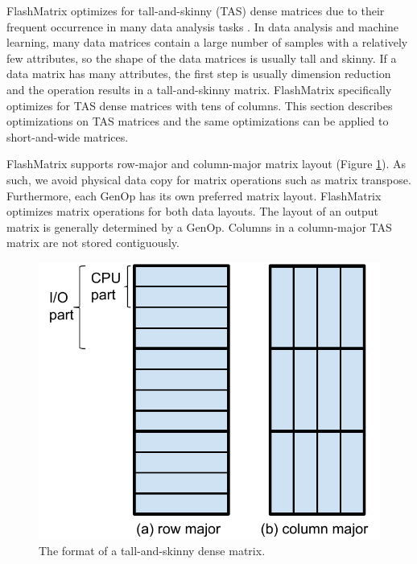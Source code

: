 FlashMatrix optimizes for tall-and-skinny (TAS) dense matrices due to their
frequent occurrence in many data analysis tasks \cite{}.
In data analysis and machine learning, many data matrices contain a large
number of samples with a relatively few attributes, so the shape
of the data matrices is usually tall and skinny. If a data matrix has many
attributes, the first step is usually dimension reduction \cite{} and
the operation results in a tall-and-skinny matrix.
FlashMatrix specifically optimizes for TAS dense matrices with tens of columns.
This section describes optimizations on TAS matrices and the same optimizations
can be applied to short-and-wide matrices.

FlashMatrix supports row-major and column-major matrix layout (Figure
\ref{fig:tas_mat}). As such,
we avoid physical data copy for matrix operations such as matrix transpose.
Furthermore, each GenOp has its own preferred matrix layout. FlashMatrix
optimizes matrix operations for both data layouts. The layout of an output
matrix is generally determined by a GenOp. Columns in a column-major TAS matrix
are not stored contiguously.

\begin{figure}
	\centering
	\includegraphics[scale=0.5]{./dense_matrix.pdf}
	\caption{The format of a tall-and-skinny dense matrix.}
	\label{fig:tas_mat}
\end{figure}

